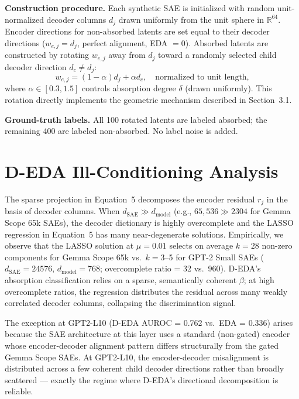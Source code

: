 \documentclass{article}
\begin{document}
\textbf{Construction procedure.} Each synthetic SAE is initialized with random unit-normalized decoder columns $d_j$ drawn uniformly from the unit sphere in $\mathbb{R}^{64}$. Encoder directions for non-absorbed latents are set equal to their decoder directions ($w_{e,j} = d_j$, perfect alignment, EDA $= 0$). Absorbed latents are constructed by rotating $w_{e,j}$ away from $d_j$ toward a randomly selected child decoder direction $d_c \neq d_j$:
\begin{equation*}
w_{e,j} = (1-\alpha) d_j + \alpha d_c, \quad \text{normalized to unit length,}
\end{equation*}
where $\alpha \in [0.3, 1.5]$ controls absorption degree $\delta$ (drawn uniformly). This rotation directly implements the geometric mechanism described in Section~3.1.

\textbf{Ground-truth labels.} All 100 rotated latents are labeled absorbed; the remaining 400 are labeled non-absorbed. No label noise is added.

\section{D-EDA Ill-Conditioning Analysis}
\label{sec:deda_ill}

The sparse projection in Equation~5 decomposes the encoder residual $r_j$ in the basis of decoder columns. When $d_{\text{SAE}} \gg d_{\text{model}}$ (e.g., $65{,}536 \gg 2304$ for Gemma Scope 65k SAEs), the decoder dictionary is highly overcomplete and the LASSO regression in Equation~5 has many near-degenerate solutions. Empirically, we observe that the LASSO solution at $\mu = 0.01$ selects on average $k = 28$ non-zero components for Gemma Scope 65k vs.\ $k = 3$--5 for GPT-2 Small SAEs ($d_{\text{SAE}} = 24576$, $d_{\text{model}} = 768$; overcomplete ratio = 32 vs.\ 960). D-EDA's absorption classification relies on a sparse, semantically coherent $\beta$; at high overcomplete ratios, the regression distributes the residual across many weakly correlated decoder columns, collapsing the discrimination signal.

The exception at GPT2-L10 (D-EDA AUROC = 0.762 vs.\ EDA = 0.336) arises because the SAE architecture at this layer uses a standard (non-gated) encoder whose encoder-decoder alignment pattern differs structurally from the gated Gemma Scope SAEs. At GPT2-L10, the encoder-decoder misalignment is distributed across a few coherent child decoder directions rather than broadly scattered — exactly the regime where D-EDA's directional decomposition is reliable.
\end{document}
